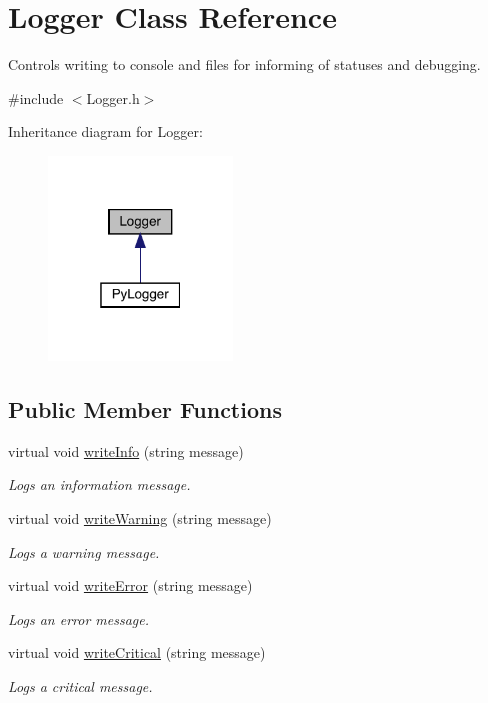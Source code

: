 \hypertarget{class_logger}{}\section{Logger Class Reference}
\label{class_logger}


Controls writing to console and files for informing of statuses and debugging.  




{\ttfamily \#include $<$Logger.\+h$>$}



Inheritance diagram for Logger\+:
\nopagebreak
\begin{figure}[H]
\begin{center}
\leavevmode
\includegraphics[width=139pt]{class_logger__inherit__graph}
\end{center}
\end{figure}
\subsection*{Public Member Functions}
\begin{DoxyCompactItemize}
\item 
virtual void \hyperlink{class_logger_af0f328114c079a74bbe248e0bb2e3c88}{write\+Info} (string message)
\begin{DoxyCompactList}\small\item\em Logs an information message. \end{DoxyCompactList}\item 
virtual void \hyperlink{class_logger_a58e0b78e7be20e3769d58b5b8a2686bb}{write\+Warning} (string message)
\begin{DoxyCompactList}\small\item\em Logs a warning message. \end{DoxyCompactList}\item 
virtual void \hyperlink{class_logger_aed1644bc348e328cf0c3dc3e199ce908}{write\+Error} (string message)
\begin{DoxyCompactList}\small\item\em Logs an error message. \end{DoxyCompactList}\item 
virtual void \hyperlink{class_logger_afb8e520f94b5438bc39013c14549f271}{write\+Critical} (string message)
\begin{DoxyCompactList}\small\item\em Logs a critical message. \end{DoxyCompactList}\end{DoxyCompactItemize}


